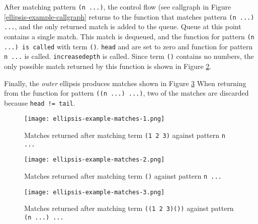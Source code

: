 After matching pattern \texttt{(n ...)}, the control flow (see callgraph in Figure \ref{ellipsis-example-callgraph} returns to the function that matches pattern \texttt{(n ...) ...}, and the only returned match is added to the queue. Queue at this point contains a single match. This match is dequeued, and the function for pattern \texttt{(n ...) is called} with term \texttt{()}. \texttt{head} and  are set to zero and function for pattern \texttt{n ...} is called. \texttt{increasedepth} is called. Since term \texttt{()} contains no numbers, the only possible match returned by this function is shown in Figure \ref{ellipsis-example-matches-2}.

Finally, the \textit{outer} ellipsis produces matches shown in Figure \ref{ellipsis-example-matches-3} When returning from the function for pattern \texttt{((n ...) ...)}, two of the matches are discarded because \texttt{head != tail}.

\begin{figure}[!htb]
\texttt{[image: ellipsis-example-matches-1.png]}
\caption{Matches returned after matching term \texttt{(1 2 3)} against pattern \texttt{n ...}}
\label{ellipsis-example-matches-1}
\end{figure}

\begin{figure}[!tbh]
\texttt{[image: ellipsis-example-matches-2.png]}
\caption{Matches returned after matching term \texttt{()} against pattern \texttt{n ...}}
\label{ellipsis-example-matches-2}
\end{figure}

\begin{figure}[!htb]
\texttt{[image: ellipsis-example-matches-3.png]}
\caption{Matches returned after matching term \texttt{((1 2 3)())} against pattern \texttt{(n ...) ...} }
\label{ellipsis-example-matches-3}
\end{figure}
